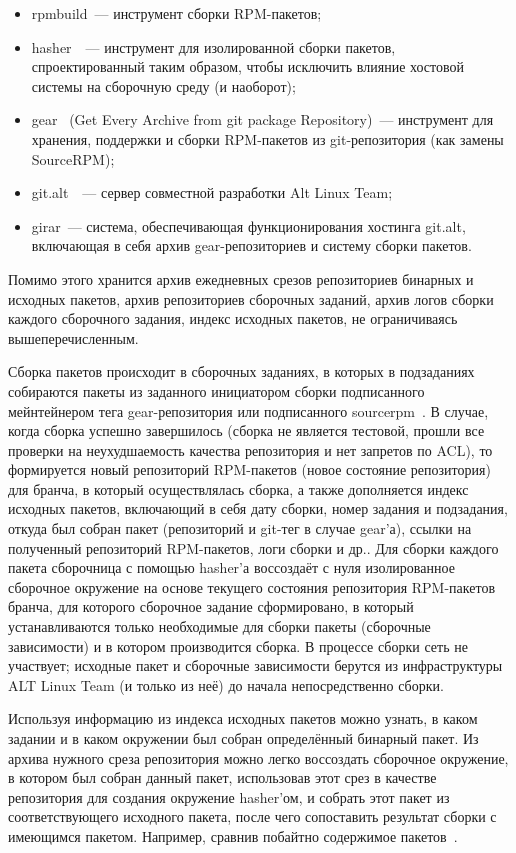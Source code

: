 \documentclass[10pt, a5paper]{article}
\begin{document}
\begin{itemize}
  \item rpmbuild~--- инструмент сборки RPM-пакетов;
  \item hasher~\cite{Seleznev-2}~--- инструмент для изолированной сборки пакетов, спроектированный таким образом, чтобы исключить влияние хостовой системы на сборочную среду (и наоборот);
  \item gear~\cite{Seleznev-3} (Get Every Archive from git package Repository)~--- инструмент для хранения, поддержки и сборки RPM-пакетов из git-репозитория (как замены SourceRPM);
  \item git.alt~\cite{Seleznev-4}~--- сервер совместной разработки Alt Linux Team;
  \item girar~--- система, обеспечивающая функционирования хостинга git.alt, включающая в себя архив gear-репозиториев и систему сборки пакетов.
\end{itemize}

Помимо этого хранится архив ежедневных срезов репозиториев бинарных и исходных пакетов, архив репозиториев сборочных заданий, архив логов сборки каждого сборочного задания, индекс исходных пакетов, не ограничиваясь вышеперечисленным.

Сборка пакетов происходит в сборочных заданиях, в которых в подзаданиях собираются пакеты из заданного инициатором сборки подписанного мейнтейнером тега gear-репозитория или подписанного sourcerpm~\cite{Seleznev-4}. В случае, когда сборка успешно завершилось (сборка не является тестовой, прошли все проверки на неухудшаемость качества репозитория и нет запретов по ACL), то формируется новый репозиторий RPM-пакетов (новое состояние репозитория) для бранча, в который осуществлялась сборка, а также дополняется индекс исходных пакетов, включающий в себя дату сборки, номер задания и подзадания, откуда был собран пакет (репозиторий и git-тег в случае gear'а), ссылки на полученный репозиторий RPM-пакетов, логи сборки и др.. Для сборки каждого пакета сборочница с помощью hasher'а воссоздаёт с нуля изолированное сборочное окружение на основе текущего состояния репозитория RPM-пакетов бранча, для которого сборочное задание сформировано, в который устанавливаются только необходимые для сборки пакеты (сборочные зависимости) и в котором производится сборка. В процессе сборки сеть не участвует; исходные пакет и сборочные зависимости берутся из инфраструктуры ALT Linux Team (и только из неё) до начала непосредственно сборки.

Используя информацию из индекса исходных пакетов можно узнать, в каком задании и в каком окружении был собран определённый бинарный пакет. Из архива нужного среза репозитория можно легко воссоздать сборочное окружение, в котором был собран данный пакет, использовав этот срез в качестве репозитория для создания окружение hasher'ом, и собрать этот пакет из соответствующего исходного пакета, после чего сопоставить результат сборки с имеющимся пакетом. Например, сравнив побайтно содержимое пакетов~\cite{Seleznev-7}.
\end{document}

